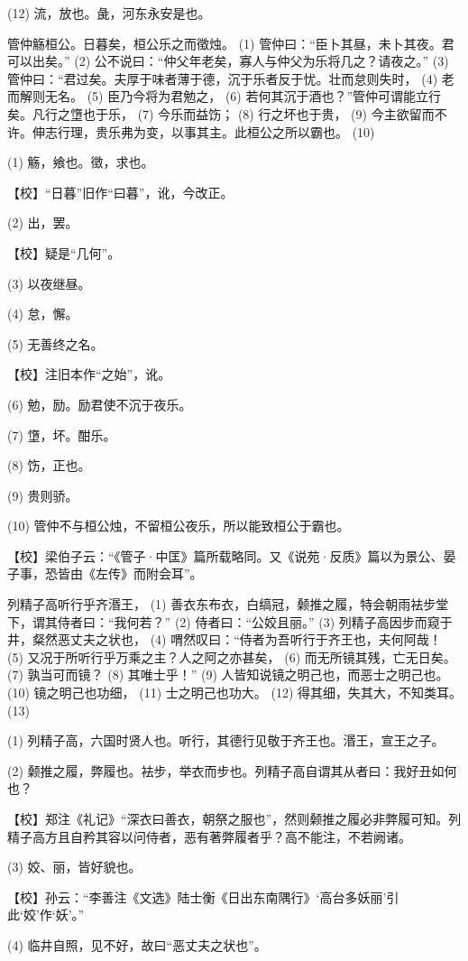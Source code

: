 \documentclass[12pt,UTF8]{ctexbook}
\begin{document}
(12) 流，放也。彘，河东永安是也。

管仲觞桓公。日暮矣，桓公乐之而徵烛。 (1) 管仲曰：“臣卜其昼，未卜其夜。君可以出矣。” (2) 公不说曰：“仲父年老矣，寡人与仲父为乐将几之？请夜之。” (3) 管仲曰：“君过矣。夫厚于味者薄于德，沉于乐者反于忧。壮而怠则失时， (4) 老而解则无名。 (5) 臣乃今将为君勉之， (6) 若何其沉于酒也？”管仲可谓能立行矣。凡行之墯也于乐， (7) 今乐而益饬； (8) 行之坏也于贵， (9) 今主欲留而不许。伸志行理，贵乐弗为变，以事其主。此桓公之所以霸也。 (10)

(1) 觞，飨也。徵，求也。

【校】“日暮”旧作“曰暮”，讹，今改正。

(2) 出，罢。

【校】疑是“几何”。

(3) 以夜继昼。

(4) 怠，懈。

(5) 无善终之名。

【校】注旧本作“之始”，讹。

(6) 勉，励。励君使不沉于夜乐。

(7) 墯，坏。酣乐。

(8) 饬，正也。

(9) 贵则骄。

(10) 管仲不与桓公烛，不留桓公夜乐，所以能致桓公于霸也。

【校】梁伯子云：“《管子·中匡》篇所载略同。又《说苑·反质》篇以为景公、晏子事，恐皆由《左传》而附会耳”。

列精子高听行乎齐湣王， (1) 善衣东布衣，白缟冠，颡推之履，特会朝雨袪步堂下，谓其侍者曰：“我何若？” (2) 侍者曰：“公姣且丽。” (3) 列精子高因步而窥于井，粲然恶丈夫之状也， (4) 喟然叹曰：“侍者为吾听行于齐王也，夫何阿哉！ (5) 又况于所听行乎万乘之主？人之阿之亦甚矣， (6) 而无所镜其残，亡无日矣。 (7) 孰当可而镜？ (8) 其唯士乎！” (9) 人皆知说镜之明己也，而恶士之明己也。 (10) 镜之明己也功细， (11) 士之明己也功大。 (12) 得其细，失其大，不知类耳。 (13)

(1) 列精子高，六国时贤人也。听行，其德行见敬于齐王也。湣王，宣王之子。

(2) 颡推之履，弊履也。袪步，举衣而步也。列精子高自谓其从者曰：我好丑如何也？

【校】郑注《礼记》“深衣曰善衣，朝祭之服也”，然则颡推之履必非弊履可知。列精子高方且自矜其容以问侍者，恶有著弊履者乎？高不能注，不若阙诸。

(3) 姣、丽，皆好貌也。

【校】孙云：“李善注《文选》陆士衡《日出东南隅行》‘高台多妖丽’引此‘姣’作‘妖’。”

(4) 临井自照，见不好，故曰“恶丈夫之状也”。
\end{document}
